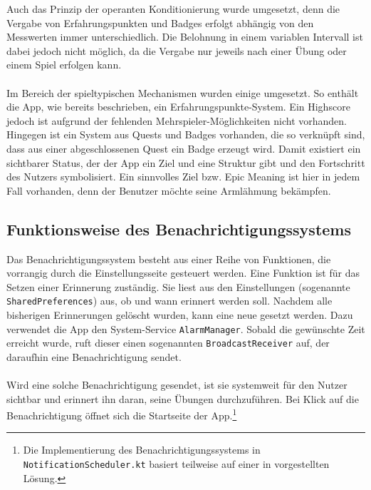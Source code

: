 Auch das Prinzip der operanten Konditionierung wurde umgesetzt, denn die Vergabe von Erfahrungspunkten und Badges erfolgt abhängig von den Messwerten immer unterschiedlich. Die Belohnung in einem variablen Intervall ist dabei jedoch nicht möglich, da die Vergabe nur jeweils nach einer Übung oder einem Spiel erfolgen kann. \\ \\
Im Bereich der spieltypischen Mechanismen wurden einige umgesetzt. So enthält die App, wie bereits beschrieben, ein Erfahrungspunkte-System. Ein Highscore jedoch ist aufgrund der fehlenden Mehrspieler-Möglichkeiten nicht vorhanden. Hingegen ist ein System aus Quests und Badges vorhanden, die so verknüpft sind, dass aus einer abgeschlossenen Quest ein Badge erzeugt wird. Damit existiert ein sichtbarer Status, der der App ein Ziel und eine Struktur gibt und den Fortschritt des Nutzers symbolisiert. Ein sinnvolles Ziel bzw. Epic Meaning ist hier in jedem Fall vorhanden, denn der Benutzer möchte seine Armlähmung bekämpfen.
\subsection{Funktionsweise des Benachrichtigungssystems}
Das Benachrichtigungssystem\cite{Src:AndroidNotify} besteht aus einer Reihe von Funktionen, die vorrangig durch die Einstellungsseite gesteuert werden. Eine Funktion ist für das Setzen einer Erinnerung zuständig. Sie liest aus den Einstellungen (sogenannte \texttt{SharedPreferences}) aus, ob und wann erinnert werden soll. Nachdem alle bisherigen Erinnerungen gelöscht wurden, kann eine neue gesetzt werden. Dazu verwendet die App den System-Service \texttt{AlarmManager}\cite{Src:NotifyDroid}. Sobald die gewünschte Zeit erreicht wurde, ruft dieser einen sogenannten \texttt{BroadcastReceiver} auf, der daraufhin eine Benachrichtigung sendet. \\ \\
Wird eine solche Benachrichtigung gesendet, ist sie systemweit für den Nutzer sichtbar und erinnert ihn daran, seine Übungen durchzuführen. Bei Klick auf die Benachrichtigung öffnet sich die Startseite der App.\footnote[3]{Die Implementierung des Benachrichtigungssystems in \texttt{NotificationScheduler.kt} basiert teilweise auf einer in  \cite{Src:NotifyDroid} vorgestellten Lösung.}